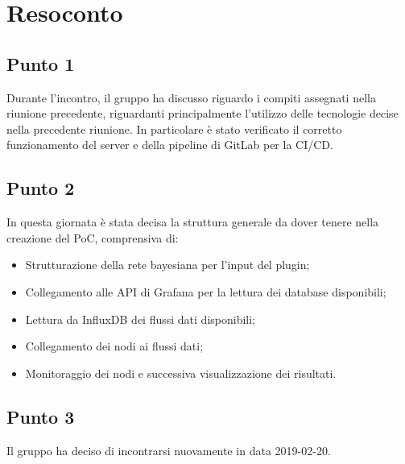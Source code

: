 \section{Resoconto}

\subsection{Punto 1}
Durante l'incontro, il gruppo ha discusso riguardo i compiti assegnati nella riunione precedente, riguardanti principalmente l'utilizzo delle tecnologie decise nella precedente riunione. In particolare è stato verificato il corretto funzionamento del server e della pipeline di GitLab per la CI/CD.

\subsection{Punto 2}

In questa giornata è stata decisa la struttura generale da dover tenere nella creazione del PoC, comprensiva di:
\begin{itemize}
	\item Strutturazione della rete bayesiana per l'input del plugin;
	\item Collegamento alle API di Grafana per la lettura dei database disponibili;
	\item Lettura da InfluxDB dei flussi dati disponibili; 
	\item Collegamento dei nodi ai flussi dati;
	\item Monitoraggio dei nodi e successiva visualizzazione dei risultati.
\end{itemize}

\subsection{Punto 3}
Il gruppo ha deciso di incontrarsi nuovamente in data 2019-02-20.